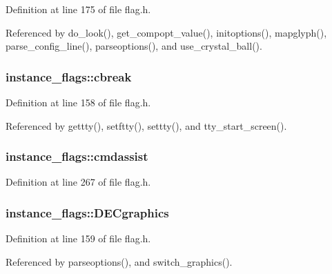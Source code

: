 Definition at line 175 of file flag.\+h.



Referenced by do\+\_\+look(), get\+\_\+compopt\+\_\+value(), initoptions(), mapglyph(), parse\+\_\+config\+\_\+line(), parseoptions(), and use\+\_\+crystal\+\_\+ball().

\hypertarget{structinstance__flags_acc12d1d0c33d63aee349eac10eec35a5}{
\subsubsection[{cbreak}]{ instance\+\_\+flags\+::cbreak}}\label{structinstance__flags_acc12d1d0c33d63aee349eac10eec35a5}


Definition at line 158 of file flag.\+h.



Referenced by gettty(), setftty(), settty(), and tty\+\_\+start\+\_\+screen().

\hypertarget{structinstance__flags_a9205d199fb280444af9315a6640250b9}{
\subsubsection[{cmdassist}]{ instance\+\_\+flags\+::cmdassist}}\label{structinstance__flags_a9205d199fb280444af9315a6640250b9}


Definition at line 267 of file flag.\+h.

\hypertarget{structinstance__flags_ab2cddd19049fbf0fa4be5255bddfd633}{
\subsubsection[{D\+E\+Cgraphics}]{ instance\+\_\+flags\+::\+D\+E\+Cgraphics}}\label{structinstance__flags_ab2cddd19049fbf0fa4be5255bddfd633}


Definition at line 159 of file flag.\+h.



Referenced by parseoptions(), and switch\+\_\+graphics().

